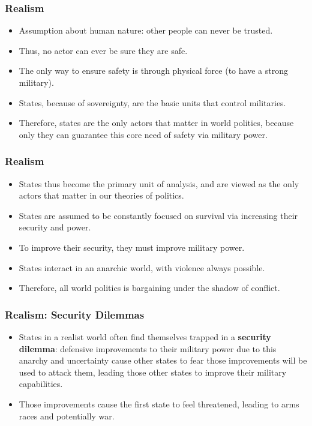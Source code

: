 \documentclass[handout]{beamer}
\begin{document}
\begin{frame} 
\frametitle{\LARGE{Realism}}
\begin{itemize}
    \item Assumption about human nature: \pause other people can never be trusted. \pause 
    \item Thus, no actor can ever be sure they are safe. \pause
    \item The only way to ensure safety is through physical force (to have a strong military). \pause
    \item States, because of sovereignty, are the basic units that control militaries. \pause
    \item Therefore, states are the only actors that matter in world politics, because only they can guarantee this core need of safety via military power.
\end{itemize}
\end{frame}

\begin{frame} 
\frametitle{\LARGE{Realism}}
    \begin{itemize}
        \item States thus become the primary unit of analysis, and are viewed as the only actors that matter in our theories of politics. \pause
        \item States are assumed to be constantly focused on survival via increasing their security and power. \pause 
        \item To improve their security, they must improve military power. \pause 
        \item States interact in an anarchic world, with violence always possible. \pause
        \item Therefore, all world politics is bargaining under the shadow of conflict. 
    \end{itemize}
\end{frame}

\begin{frame} 
	\frametitle{\LARGE{Realism: Security Dilemmas}}
	\begin{itemize}
		\item States in a realist world often find themselves trapped in a \textbf{security dilemma}: defensive improvements to their military power due to this anarchy and uncertainty cause other states to fear those improvements will be used to attack them, leading those other states to improve their military capabilities. \pause
		\item Those improvements cause the first state to feel threatened, leading to arms races and potentially war.
	\end{itemize}
\end{frame}
       
\end{document}
